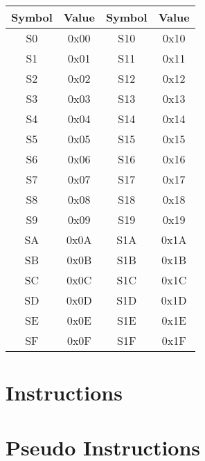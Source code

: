         \begin{table}[h!]
            \begin{tabular}{|cc|cc|}
                \hline
                Symbol & Value & Symbol & Value \\\hline
                S0     & 0x00  & S10    & 0x10  \\\hline
                S1     & 0x01  & S11    & 0x11  \\\hline
                S2     & 0x02  & S12    & 0x12  \\\hline
                S3     & 0x03  & S13    & 0x13  \\\hline
                S4     & 0x04  & S14    & 0x14  \\\hline
                S5     & 0x05  & S15    & 0x15  \\\hline
                S6     & 0x06  & S16    & 0x16  \\\hline
                S7     & 0x07  & S17    & 0x17  \\\hline
                S8     & 0x08  & S18    & 0x18  \\\hline
                S9     & 0x09  & S19    & 0x19  \\\hline
                SA     & 0x0A  & S1A    & 0x1A  \\\hline
                SB     & 0x0B  & S1B    & 0x1B  \\\hline
                SC     & 0x0C  & S1C    & 0x1C  \\\hline
                SD     & 0x0D  & S1D    & 0x1D  \\\hline
                SE     & 0x0E  & S1E    & 0x1E  \\\hline
                SF     & 0x0F  & S1F    & 0x1F  \\\hline
            \end{tabular}
        \end{table}

\clearpage
\section{Instructions}
    

\clearpage
\section{Pseudo Instructions}
    

\clearpage
